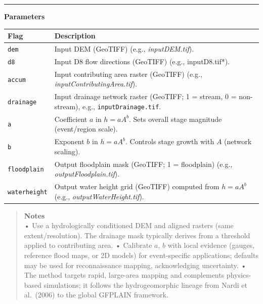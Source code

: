 \documentclass[
]{book}
\begin{document}
\begin{center}\rule{0.5\linewidth}{0.5pt}\end{center}

\textbf{Parameters}

\begin{longtable}[]{@{}
  >{\raggedright\arraybackslash}p{}
  >{\raggedright\arraybackslash}p{}@{}}
\toprule\noalign{}
\begin{minipage}[b]{\linewidth}\raggedright
Flag
\end{minipage} & \begin{minipage}[b]{\linewidth}\raggedright
Description
\end{minipage} \\
\midrule\noalign{}
\endhead
\bottomrule\noalign{}
\endlastfoot
\texttt{dem} & Input DEM (GeoTIFF) (e.g., \emph{inputDEM.tif}). \\
\texttt{d8} & Input D8 flow directions (GeoTIFF) (e.g., inputD8.tif*). \\
\texttt{accum} & Input contributing area raster (GeoTIFF) (e.g., \emph{inputContributingArea.tif}). \\
\texttt{drainage} & Input drainage network raster (GeoTIFF; 1 = stream, 0 = non-stream), e.g., \texttt{inputDrainage.tif}. \\
\texttt{a} & Coefficient \(a\) in \(h=aA^b\). Sets overall stage magnitude (event/region scale). \\
\texttt{b} & Exponent \(b\) in \(h=aA^b\). Controls stage growth with \(A\) (network scaling). \\
\texttt{floodplain} & Output floodplain mask (GeoTIFF; 1 = floodplain) (e.g., \emph{outputFloodplain.tif}). \\
\texttt{waterheight} & Output water height grid (GeoTIFF) computed from \(h=aA^b\) (e.g., \emph{outputWaterHeight.tif}). \\
\end{longtable}

\begin{quote}
\textbf{Notes}\\
• Use a hydrologically conditioned DEM and aligned rasters (same extent/resolution). The drainage mask typically derives from a threshold applied to contributing area.
• Calibrate \(a\), \(b\) with local evidence (gauges, reference flood maps, or 2D models) for event-specific applications; defaults may be used for reconnaissance mapping, acknowledging uncertainty.
• The method targets rapid, large-area mapping and complements physics-based simulations; it follows the hydrogeomorphic lineage from Nardi et al.~(2006) to the global GFPLAIN framework.
\end{quote}
\end{document}
